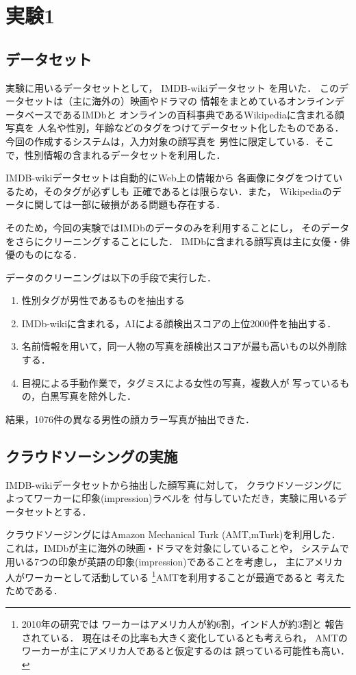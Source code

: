 \chapter{実験1}
\section{データセット \label{sec:ch2:dataset}}
実験に用いるデータセットとして，
IMDB-wikiデータセット
\cite{Rothe-ICCVW-2015,Rothe-IJCV-2018,imdb-wiki}を用いた．
このデータセットは（主に海外の）映画やドラマの
情報をまとめているオンラインデータベースであるIMDbと
オンラインの百科事典であるWikipediaに含まれる顔写真を
人名や性別，年齢などのタグをつけてデータセット化したものである．
今回の作成するシステムは，入力対象の顔写真を
男性に限定している．そこで，性別情報の含まれるデータセットを利用した．

IMDB-wikiデータセットは自動的にWeb上の情報から
各画像にタグをつけているため，そのタグが必ずしも
正確であるとは限らない．また，
Wikipediaのデータに関しては一部に破損がある問題も存在する．

そのため，今回の実験ではIMDbのデータのみを利用することにし，
そのデータをさらにクリーニングすることにした．
IMDbに含まれる顔写真は主に女優・俳優のものになる．

データのクリーニングは以下の手段で実行した．
\begin{enumerate}
  \item 性別タグが男性であるものを抽出する
  \item IMDb-wikiに含まれる，AIによる顔検出スコアの上位2000件を抽出する．
  \item 名前情報を用いて，同一人物の写真を顔検出スコアが最も高いもの以外削除する．
  \item 目視による手動作業で，タグミスによる女性の写真，複数人が
  写っているもの，白黒写真を除外した．
\end{enumerate}
結果，1076件の異なる男性の顔カラー写真が抽出できた．

\section{クラウドソーシングの実施}
IMDB-wikiデータセットから抽出した顔写真に対して，
クラウドソージングによってワーカーに印象(impression)ラベルを
付与していただき，実験に用いるデータセットとする．

クラウドソージングにはAmazon Mechanical Turk (AMT,mTurk)を利用した．
これは，IMDbが主に海外の映画・ドラマを対象にしていることや，
システムで用いる7つの印象が英語の印象(impression)であることを考慮し，
主にアメリカ人がワーカーとして活動している
\footnote{
2010年の研究では
ワーカーはアメリカ人が約6割，インド人が約3割と
報告されている\cite{10.1145/1753846.1753873}．
現在はその比率も大きく変化しているとも考えられ，
AMTのワーカーが主にアメリカ人であると仮定するのは
誤っている可能性も高い．
}AMTを利用することが最適であると
考えたためである．

